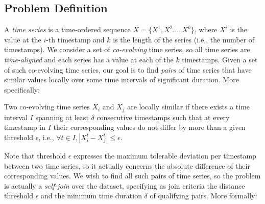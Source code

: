 \subsection{Problem Definition}
\label{sec:problem}


A {\em time series} is a time-ordered sequence $X = \{X^1, X^2 \ldots, X^{k}\}$, where $X^{i}$ is the value at the $i$-th timestamp and $k$ is the length of the series (i.e., the number of timestamps). We consider a set of {\em co-evolving} time series, so all time series are {\em time-aligned} and each series has a value at each of the $k$ timestamps. Given a set of such co-evolving time series, our goal is to find {\em pairs} of time series that have similar values locally over some time intervals of significant duration. More specifically:


\begin{mydefinition}
Two co-evolving time series $X_i$ and $X_j$ are locally similar if there exists a time interval $I$ spanning at least $\delta$ consecutive timestamps such that at every timestamp in $I$ their corresponding values do not differ by more than a given threshold $\epsilon$, i.e., $\forall t \in I, |X^{t}_i - X^{t}_j| \leq \epsilon$.
\end{mydefinition}



Note that threshold $\epsilon$ expresses the maximum tolerable deviation per timestamp between two time series, so it actually concerns the absolute difference of their corresponding values. We wish to find all such pairs of time series, so the problem is actually a {\em self-join} over the dataset, specifying as join criteria the distance threshold $\epsilon$ and the minimum time duration $\delta$ of qualifying pairs. More formally:

